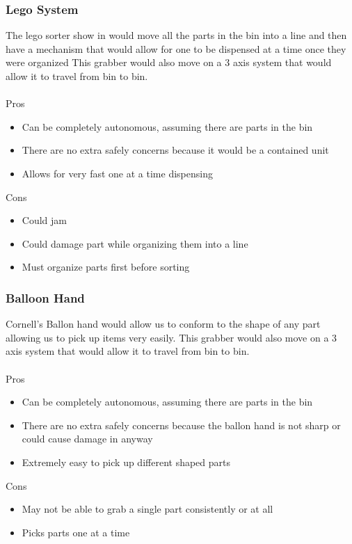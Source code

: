 \documentclass[12pt]{report}
\begin{document}
\subsubsection*{Lego System}
The lego sorter show in \cite{legoSorter} would move all the parts in the bin into a line and then have a mechanism that would allow for one to be dispensed at a time once they were organized This grabber would also move on a 3 axis system that would allow it to travel from bin to bin.\\ \\
Pros
\begin{itemize}
\item Can be completely autonomous, assuming there are parts in the bin
\item There are no extra safely concerns because it would be a contained unit
\item Allows for very fast one at a time dispensing
\end{itemize}
Cons
\begin{itemize}
\item Could jam
\item Could damage part while organizing them into a line
\item Must organize parts first before sorting
\end{itemize}

\subsubsection*{Balloon Hand}
Cornell's Ballon hand would allow us to conform to the shape of any part allowing us to pick up items very easily. This grabber would also move on a 3 axis system that would allow it to travel from bin to bin. \\ \\
Pros
\begin{itemize}
\item Can be completely autonomous, assuming there are parts in the bin
\item There are no extra safely concerns because the ballon hand is not sharp or could cause damage in anyway
\item Extremely easy to pick up different shaped parts
\end{itemize}
Cons
\begin{itemize}
\item May not be able to grab a single part consistently or at all
\item Picks parts one at a time
\end{itemize}
\end{document}
